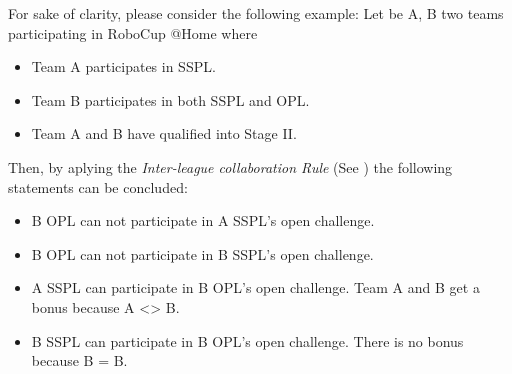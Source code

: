 For sake of clarity, please consider the following example: Let be A, B two teams participating in RoboCup @Home where
\begin{itemize}
    \item Team A participates in SSPL.
    \item Team B participates in both SSPL and OPL.
    \item Team A and B have qualified into Stage II.
\end{itemize}
Then, by aplying the \textit{Inter-league collaboration Rule} (See ) the following statements can be concluded:
\begin{itemize}
  \item B OPL can not participate in A SSPL's open challenge.
  \item B OPL can not participate in B SSPL's open challenge.
  \item A SSPL can participate in B OPL's open challenge. Team A and B get a bonus because A <> B.
  \item B SSPL can participate in B OPL's open challenge. There is no bonus because B = B.
\end{itemize}





